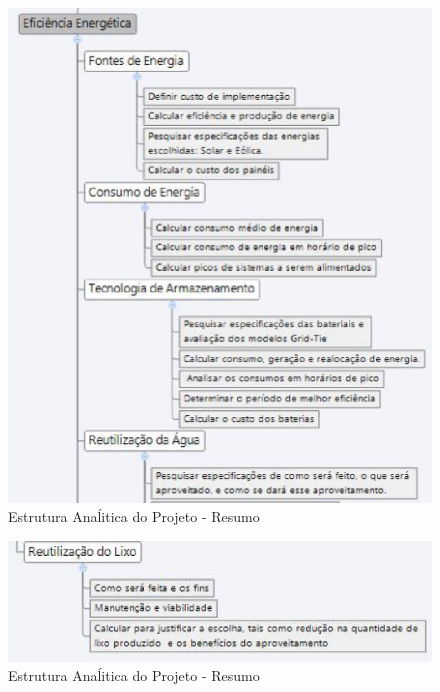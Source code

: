 \begin{figure}[H]
\centering
\includegraphics[keepaspectratio,scale=0.6]{figuras/EAP_energia.eps}
\caption{Estrutura Anaĺitica do Projeto - Resumo}
\end{figure}

\begin{figure}[H]
\centering
\includegraphics[keepaspectratio,scale=0.6]{figuras/EAP_energia1.eps}
\caption{Estrutura Anaĺitica do Projeto - Resumo}
\end{figure}

